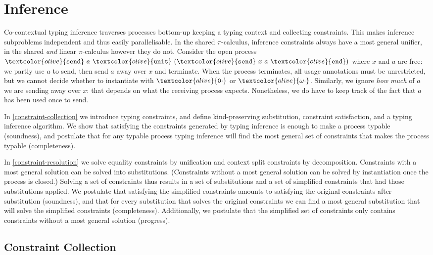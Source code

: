 \documentclass[sigplan,screen,review]{acmart}
\theoremstyle{definition}\newtheorem{mytheorem}{Theorem}[section]
\newcommand{\picalc}{$\pi$-calculus}
\newcommand{\constr}[1]{\textcolor{olive}{\mathtt{#1}}}
\newcommand{\sunit}{\constr{unit}}
\newcommand{\send}{\constr{end}}
\newcommand{\ssend}{\constr{send}}
\newcommand{\tzero}{\constr{0\cdot}}
\newcommand{\tomega}{\constr{\omega\cdot}}
\begin{document}
     
\section{Inference}\label{inference}

Co-contextual typing inference traverses processes bottom-up keeping a typing context and collecting constraints.
This makes inference subproblems independent and thus easily parallelisable.
In the shared \picalc{}, inference constraints always have a most general unifier, in the shared \emph{and} linear \picalc{} however they do not.
Consider the open process $\ssend~a~\sunit~(\ssend~x~a~\send)$ where $x$ and $a$ are free: we partly use $a$ to send, then send $a$ away over $x$ and terminate.
When the process terminates, all usage annotations must be unrestricted, but we cannot decide whether to instantiate with $\tzero$ or $\tomega$.
Similarly, we ignore \emph{how much} of $a$ we are sending away over $x$: that depends on what the receiving process expects.
Nonetheless, we do have to keep track of the fact that $a$ has been used once to send.

In \autoref{constraint-collection} we introduce typing constraints, and define kind-preserving substitution, constraint satisfaction, and a typing inference algorithm.
We show that satisfying the constraints generated by typing inference is enough to make a process typable (soundness), and postulate that for any typable process typing inference will find the most general set of constraints that makes the process typable (completeness).

In \autoref{constraint-resolution} we solve equality constraints by unification and context split constraints by decomposition.
Constraints with a most general solution can be solved into substitutions.
(Constraints without a most general solution can be solved by instantiation once the process is closed.)
Solving a set of constraints thus results in a set of substitutions and a set of simplified constraints that had those substitutions applied.
We postulate that satisfying the simplified constraints amounts to satisfying the original constraints after substitution (soundness), and that for every substitution that solves the original constraints we can find a most general substitution that will solve the simplified constraints (completeness).
Additionally, we postulate that the simplified set of constraints only contains constraints without a most general solution (progress).

\subsection{Constraint Collection}
\label{constraint-collection}
\end{document}
